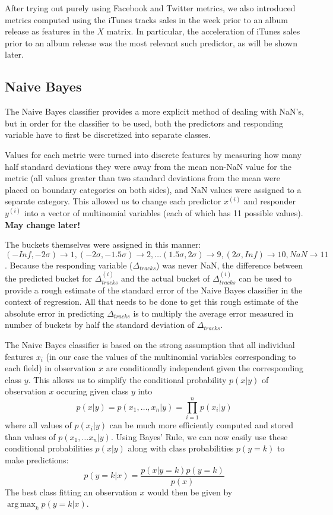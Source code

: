 \documentclass[conference]{IEEEtran}
\DeclareMathOperator*{\argmax}{arg\,max}
\begin{document}
After trying out purely using Facebook and Twitter metrics, we also introduced metrics computed using the iTunes tracks sales in the week prior to an album release as features in the $X$ matrix. In particular, the acceleration of iTunes sales prior to an album release was the most relevant such predictor, as will be shown later.

\subsection{Naive Bayes}
The Naive Bayes classifier provides a more explicit method of dealing with NaN's, but in order for the classifier to be used, both the predictors and responding variable have to first be discretized into separate classes.

Values for each metric were turned into discrete features by measuring how many half standard deviations they were away from the mean non-NaN value for the metric (all values greater than two standard deviations from the mean were placed on boundary categories on both sides), and NaN values were assigned to a separate category. This allowed us to change each predictor $x^{(i)}$ and responder $y^{(i)}$ into a vector of multinomial variables (each of which has 11 possible values). \textbf{May change later!}

The buckets themselves were assigned in this manner: $(-Inf, -2\sigma)\rightarrow1, (-2\sigma, -1.5\sigma)\rightarrow2, \dots (1.5\sigma,2\sigma)\rightarrow9, (2\sigma,Inf)\rightarrow10, NaN\rightarrow11$. Because the responding variable ($\Delta_{tracks}$) was never NaN, the difference between the predicted bucket for $\Delta_{tracks}^{(i)}$ and the actual bucket of $\Delta_{tracks}^{(i)}$ can be used to provide a rough estimate of the standard error of the Naive Bayes classifier in the context of regression. All that needs to be done to get this rough estimate of the absolute error in predicting $\Delta_{tracks}$ is to multiply the average error measured in number of buckets by half the standard deviation of $\Delta_{tracks}$.

The Naive Bayes classifier is based on the strong assumption that all individual features $x_i$ (in our case the values of the multinomial variables corresponding to each field) in observation $x$ are conditionally independent given the corresponding class $y$. This allows us to simplify the conditional probability $p(x|y)$ of observation $x$ occuring given class $y$ into
$$p(x|y) = p(x_1,\dots,x_n | y) = \prod_{i=1}^n p(x_i|y)$$
where all values of $p(x_i|y)$ can be much more efficiently computed and stored than values of $p(x_1,\dots x_n|y)$. Using Bayes' Rule, we can now easily use these conditional probabilities $p(x|y)$ along with class probabilities $p(y=k)$ to make predictions:
$$p(y=k|x) = \frac{p(x|y=k)p(y=k)}{p(x)}$$
The best class fitting an observation $x$ would then be given by $\argmax_k p(y=k|x)$.
\end{document}
